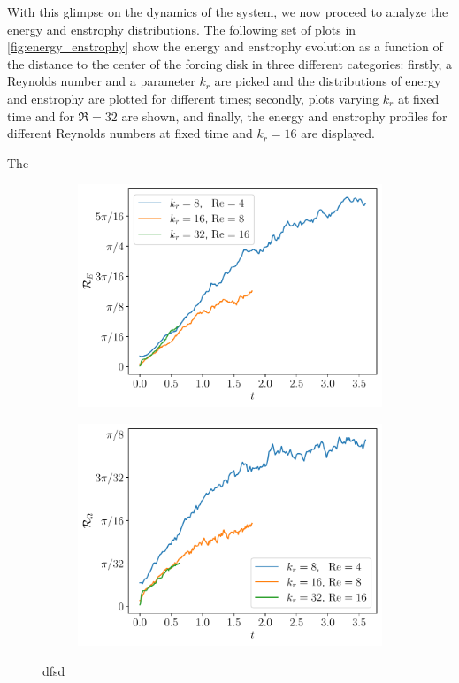 \documentclass[../main.tex]{subfiles}
\begin{document}
With this glimpse on the dynamics of the system, we now proceed to analyze the energy and enstrophy distributions. The following set of plots in \cref{fig:energy_enstrophy} show the energy and enstrophy evolution as a function of the distance to the center of the forcing disk in three different categories: firstly, a Reynolds number and a parameter $k_r$ are picked and the distributions of energy and enstrophy are plotted for different times; secondly, plots varying $k_r$ at fixed time and for $\Re=32$ are shown, and finally, the energy and enstrophy profiles for different Reynolds numbers at fixed time and $k_r=16$ are displayed.

The

\begin{figure}[ht]
	\centering
	\begin{subfigure}{0.44\textwidth}
		\centering
		\includegraphics[width=\textwidth]{images/EnergyMeanRadius.pdf}
	\end{subfigure}\hspace{0.04\textwidth}
	\begin{subfigure}{0.44\textwidth}
		\centering
		\includegraphics[width=\textwidth]{images/EnstrophyMeanRadius.pdf}
	\end{subfigure}
	\caption{dfsd}\label{fig:energy_enstrophy_mean}
\end{figure}
\end{document}
